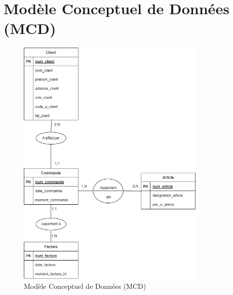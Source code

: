 \documentclass[a4paper,11pt]{article}
\begin{document}
\section{Modèle Conceptuel de Données (MCD)}
\begin{figure}[H] 
    \centering
    \includegraphics[width=0.8\textwidth]{exo4-mcd.png}
    \caption{Modèle Conceptuel de Données (MCD)}
    \label{fig:mcd}
\end{figure}
\end{document}
